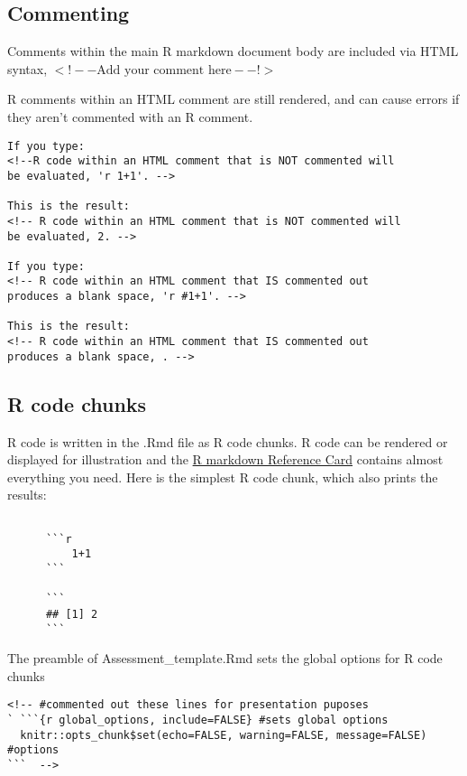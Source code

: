 \documentclass[12pt,]{article}
\begin{document}
\subsection{Commenting}\label{commenting}

Comments within the main R markdown document body are included via HTML
syntax, \(<!-- \text{Add your comment here} --!>\)

R comments within an HTML comment are still rendered, and can cause
errors if they aren't commented with an R comment.

\begin{Verbatim}[frame=single]
If you type:
<!--R code within an HTML comment that is NOT commented will
be evaluated, 'r 1+1'. -->

This is the result:
<!-- R code within an HTML comment that is NOT commented will 
be evaluated, 2. -->

If you type:
<!-- R code within an HTML comment that IS commented out  
produces a blank space, 'r #1+1'. -->

This is the result:
<!-- R code within an HTML comment that IS commented out  
produces a blank space, . -->

\end{Verbatim}

\subsection{R code chunks}\label{r-code-chunks}

R code is written in the .Rmd file as R code chunks. R code can be
rendered or displayed for illustration and the
\href{https://www.rstudio.com/wp-content/uploads/2015/03/rmarkdown-reference.pdf}{R
markdown Reference Card} contains almost everything you need. Here is
the simplest R code chunk, which also prints the results:

\begin{Verbatim}[frame=single]
      
      ```r
          1+1
      ```
      
      ```
      ## [1] 2
      ```
\end{Verbatim}

The preamble of Assessment\_template.Rmd sets the global options for R
code chunks

\begin{Verbatim}[frame=single]
<!-- #commented out these lines for presentation puposes
` ```{r global_options, include=FALSE} #sets global options 
  knitr::opts_chunk$set(echo=FALSE, warning=FALSE, message=FALSE) #options
```  -->
\end{Verbatim}
\end{document}
